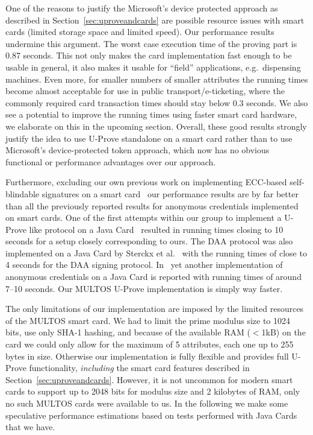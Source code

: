 One of the reasons to justify the Microsoft's device protected approach
as described in Section~\ref{sec:uproveandcards} are possible resource
issues with smart cards (limited storage space and limited speed). Our
performance results undermine this argument. The worst case execution time
of the proving part is 0.87 seconds. This not only makes the card
implementation fast enough to be usable in general, it also makes it
usable for ``field'' applications, e.g.\ dispensing machines. Even more,
for smaller numbers of smaller attributes the running times become almost
acceptable for use in public transport\slash e-ticketing, where the
commonly required card transaction times should stay below 0.3 seconds. We
also see a potential to improve the running times using faster smart card
hardware, we elaborate on this in the upcoming section. Overall, these
good results strongly justify the idea to use U-Prove standalone on a
smart card rather than to use Microsoft's device-protected token approach,
which now has no obvious functional or performance advantages over our
approach.

Furthermore, excluding our own previous work on implementing ECC-based
self-blindable signatures on a smart card~\cite{BatinaHJMV10,HoepmanJV10}
our performance results are by far better than all the previously reported
results for anonymous credentials implemented on smart cards. One of the
first attempts within our group to implement a U-Prove like protocol on a
Java Card~\cite{TewsJacobs09} resulted in running times closing to 10
seconds for a setup closely corresponding to ours. The DAA protocol was
also implemented on a Java Card by Sterckx et al.~\cite{Sterckx09} with
the running times of close to 4 seconds for the DAA signing protocol.
In~\cite{BichselCGS2009} yet another implementation of anonymous
credentials on a Java Card is reported with running times of around 7--10
seconds. Our MULTOS U-Prove implementation is simply way faster.

The only limitations of our implementation are imposed by the limited
resources of the MULTOS smart card. We had to limit the prime modulus size
to 1024 bits, use only SHA-1 hashing, and because of the available RAM
($<$1kB) on the card we could only allow for the maximum of 5 attributes,
each one up to 255 bytes in size. Otherwise our implementation is fully
flexible and provides full U-Prove functionality, \emph{including} the
smart card features described in Section~\ref{sec:uproveandcards}.
However, it is not uncommon for modern smart cards to support up to 2048
bits for modulus size and 2 kilobytes of RAM, only no such MULTOS cards
were available to us. In the following we make some speculative performance
estimations based on tests performed with Java Cards that we have.

